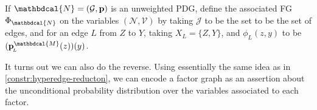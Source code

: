 \documentclass[letterpaper]{article} %
\theoremstyle{plain}
\theoremstyle{definition}
\theoremstyle{remark}
\newcommand\mat[1]{\mathbf{#1}}
\newcommand{\bp}[1][L]{\mat{p}_{\!_{#1}\!}}
\newcommand{\V}{\mathcal V}
\newcommand{\N}{\mathcal N}
\newcommand{\Ed}{\mathcal E}
\newcommand{\dg}[1]{\mathbdcal{#1}}
\newcommand{\WFGof}[1]{\Psi_{{#1}}}
\newcommand{\FGof}[1]{\Phi_{{#1}}}
\newcommand{\Gr}{\mathcal G}
\newcommand{\varsNV}[1][\N,\V]{(#1)}
\begin{document}
\begin{defn}\label{def:PDG2fg}
If $\dg N = (\Gr, \mat p)$ is an unweighted PDG, define   
the associated FG $\FGof{\dg N}$ on the 
variables $\varsNV$ by
taking $\mathcal J$ to be the set to be the set of edges, 
and for an edge $L$ from $Z$ to $Y$, taking $X_{L} = \{Z,Y\}$, and $\phi_L(z,y)$ to be $(\bp^{\dg M}(z))(y)$.
\end{defn}


It turns out we can also do the reverse. 
Using essentially the same idea as in \cref{constr:hyperedge-reducton},
we can encode a factor graph as an assertion about the unconditional
probability distribution over the variables associated to each
factor.  
\end{document}

